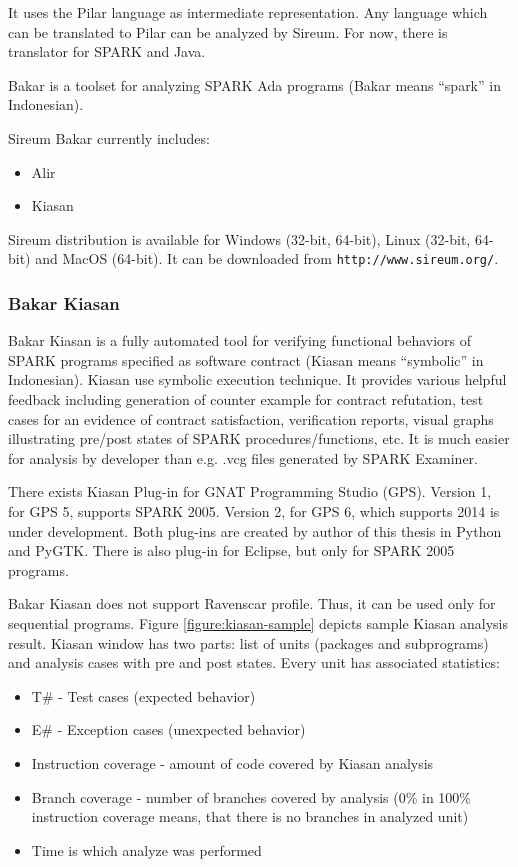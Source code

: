 It uses the Pilar language as intermediate representation. Any language which can be translated to Pilar can be analyzed by Sireum. For now, there is translator for SPARK and Java.

Bakar is a toolset for analyzing SPARK Ada programs (Bakar means “spark” in Indonesian).

Sireum Bakar currently includes:
\begin{itemize}
	\item Alir
	\item Kiasan
\end{itemize}

Sireum distribution is available for Windows (32-bit, 64-bit), Linux (32-bit, 64-bit) and MacOS (64-bit). It can be downloaded from \lstinline{http://www.sireum.org/}.


\subsubsection{Bakar Kiasan}

Bakar Kiasan \cite{Kiasan:Paper} is a fully automated tool for verifying functional behaviors of SPARK programs specified as software contract (Kiasan means “symbolic” in Indonesian). Kiasan use symbolic execution technique. It provides various helpful feedback including generation of counter example for contract refutation, test cases for an evidence of contract satisfaction, verification reports, visual graphs illustrating pre/post states of SPARK procedures/functions, etc. It is much easier for analysis by developer than e.g. .vcg files generated by SPARK Examiner.

There exists Kiasan Plug-in for GNAT Programming Studio (GPS). Version 1, for GPS 5, supports SPARK 2005. Version 2, for GPS 6, which supports 2014 is under development. Both plug-ins are created by author of this thesis in Python and PyGTK. There is also plug-in for Eclipse, but only for SPARK 2005 programs.

Bakar Kiasan does not support Ravenscar profile. Thus, it can be used only for sequential programs. Figure \ref{figure:kiasan-sample} depicts sample Kiasan analysis result. Kiasan window has two parts: list of units (packages and subprograms) and analysis cases with pre and post states. Every unit has associated statistics:
\begin{itemize}
	\item T\# - Test cases (expected behavior)
	\item E\# - Exception cases (unexpected behavior)
	\item Instruction coverage - amount of code covered by Kiasan analysis
	\item Branch coverage - number of branches covered by analysis (0\% in 100\% instruction coverage means, that there is no branches in analyzed unit)
	\item Time is which analyze was performed
\end{itemize}

